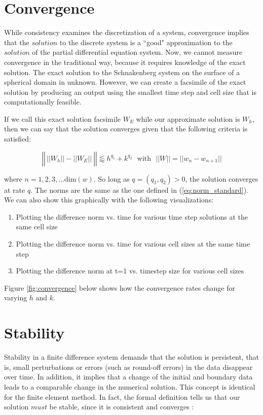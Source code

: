 \documentclass[12pt]{article}
\begin{document}
\section{Convergence}

While consistency examines the discretization of a system, convergence implies that the $solution$ to the discrete system is a ``good" approximation to the $solution$ of the partial differential equation system. Now, we cannot measure convergence in the traditional way, because it requires knowledge of the exact solution. The exact solution to the Schnakenberg system on the surface of a spherical domain in unknown. However, we can create a facsimile of the exact solution by producing an output using the smallest time step and cell size that is computationally feasible. 

If we call this exact solution facsimile $W_E$ while our approximate solution is $W_h$, then we can say that the solution converges given that the following criteria is satisfied:

\begin{equation}
	\left|\left|\frac{}{} ||W_h|| - ||W_E|| ~\right|\right| \lessapprox h^{q_1} + k^{q_2} ~~~\text{with} ~~~ ||W|| = ||w_n-w_{n+1}||
\end{equation}

\noindent where $n=1,2,3,...\text{dim}(w)$. So long as $q=(q_1,q_2) > 0$, the solution converges at rate $q$. The norms are the same as the one defined in (\ref{eq:norm_standard}). We can also show this graphically with the following visualizations:

\begin{enumerate}
	\item Plotting the difference norm vs. time for various time step solutions at the same cell size
	\item Plotting the difference norm vs. time for various cell sizes at the same time step
	\item Plotting the difference norm at t=1 vs. timestep size for various cell sizes
\end{enumerate}


Figure \ref{fig:convergence} below shows how the convergence rates change for varying $h$ and $k$. 




\section{Stability}

Stability in a finite difference system demands that the solution is persistent, that is, small perturbations or errors (such as round-off errors) in the data disappear over time. In addition, it implies that a change of the initial and boundary data leads to a comparable change in the numerical solution. This concept is identical for the finite element method. In fact, the formal definition tells us that our solution $must$ be stable, since it is consistent and converges \cite{Tadmor2012}:
\end{document}
